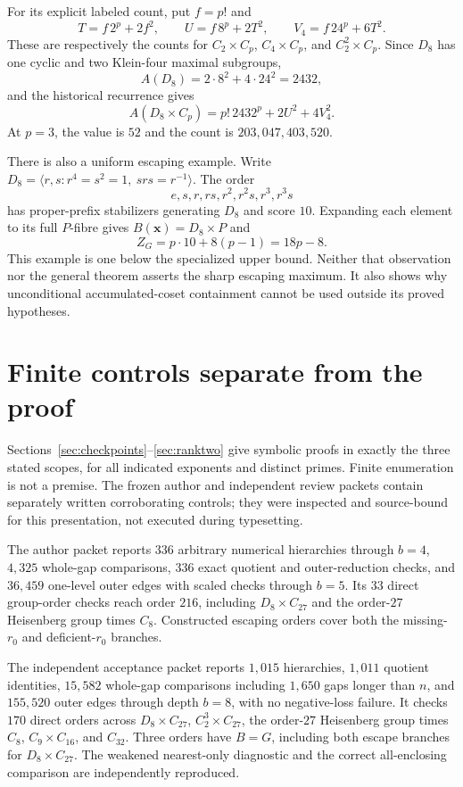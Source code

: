 \documentclass[11pt,letterpaper]{article}
\theoremstyle{definition}\newtheorem{definition}{Definition}
\begin{document}
For its explicit labeled count, put $f=p!$ and
\[
T=f\,2^p+2f^2,\qquad U=f\,8^p+2T^2,\qquad V_4=f\,24^p+6T^2.
\]
These are respectively the counts for $C_2\times C_p$, $C_4\times C_p$, and $C_2^2\times C_p$. Since $D_8$ has one cyclic and two Klein-four maximal subgroups,
\[
A(D_8)=2\cdot8^2+4\cdot24^2=2432,
\]
and the historical recurrence gives
\begin{equation}
A(D_8\times C_p)=p!\,2432^p+2U^2+4V_4^2.\label{eq:d8count}
\end{equation}
At $p=3$, the value is $52$ and the count is $203{,}047{,}403{,}520$.

There is also a uniform escaping example. Write
$D_8=\langle r,s:r^4=s^2=1,\ srs=r^{-1}\rangle$. The order
\[
e,s,r,rs,r^2,r^2s,r^3,r^3s
\]
has proper-prefix stabilizers generating $D_8$ and score $10$. Expanding each element to its full $P$-fibre gives $B(\mathbf{x})=D_8\times P$ and
\[
Z_G=p\cdot10+8(p-1)=18p-8.
\]
This example is one below the specialized upper bound. Neither that observation nor the general theorem asserts the sharp escaping maximum. It also shows why unconditional accumulated-coset containment cannot be used outside its proved hypotheses.

\section{Finite controls separate from the proof}\label{sec:controls}
Sections~\ref{sec:checkpoints}--\ref{sec:ranktwo} give symbolic proofs in exactly the three stated scopes, for all indicated exponents and distinct primes. Finite enumeration is not a premise. The frozen author and independent review packets contain separately written corroborating controls; they were inspected and source-bound for this presentation, not executed during typesetting.

The author packet reports $336$ arbitrary numerical hierarchies through $b=4$, $4{,}325$ whole-gap comparisons, $336$ exact quotient and outer-reduction checks, and $36{,}459$ one-level outer edges with scaled checks through $b=5$. Its $33$ direct group-order checks reach order $216$, including $D_8\times C_{27}$ and the order-$27$ Heisenberg group times $C_8$. Constructed escaping orders cover both the missing-$r_0$ and deficient-$r_0$ branches.

The independent acceptance packet reports $1{,}015$ hierarchies, $1{,}011$ quotient identities, $15{,}582$ whole-gap comparisons including $1{,}650$ gaps longer than $n$, and $155{,}520$ outer edges through depth $b=8$, with no negative-loss failure. It checks $170$ direct orders across $D_8\times C_{27}$, $C_2^3\times C_{27}$, the order-$27$ Heisenberg group times $C_8$, $C_9\times C_{16}$, and $C_{32}$. Three orders have $B=G$, including both escape branches for $D_8\times C_{27}$. The weakened nearest-only diagnostic and the correct all-enclosing comparison are independently reproduced.
\end{document}
